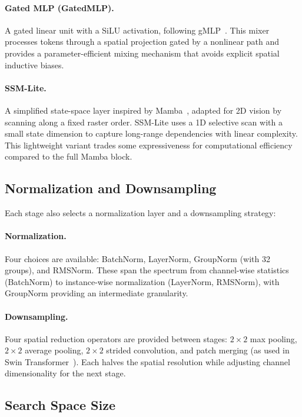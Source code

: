 \documentclass[10pt,twocolumn,letterpaper]{article}
\begin{document}
\paragraph{Gated MLP (GatedMLP).}
A gated linear unit with a SiLU activation, following gMLP~\cite{liu2021gmlp}. This mixer processes tokens through a spatial projection gated by a nonlinear path and provides a parameter-efficient mixing mechanism that avoids explicit spatial inductive biases.

\paragraph{SSM-Lite.}
A simplified state-space layer inspired by Mamba~\cite{gu2023mamba}, adapted for 2D vision by scanning along a fixed raster order. SSM-Lite uses a 1D selective scan with a small state dimension to capture long-range dependencies with linear complexity. This lightweight variant trades some expressiveness for computational efficiency compared to the full Mamba block.

\subsection{Normalization and Downsampling}
\label{sec:norm_down}

Each stage also selects a normalization layer and a downsampling strategy:

\paragraph{Normalization.}
Four choices are available: BatchNorm, LayerNorm, GroupNorm (with 32 groups), and RMSNorm. These span the spectrum from channel-wise statistics (BatchNorm) to instance-wise normalization (LayerNorm, RMSNorm), with GroupNorm providing an intermediate granularity.

\paragraph{Downsampling.}
Four spatial reduction operators are provided between stages: $2 \times 2$ max pooling, $2 \times 2$ average pooling, $2 \times 2$ strided convolution, and patch merging (as used in Swin Transformer~\cite{liu2021swin}). Each halves the spatial resolution while adjusting channel dimensionality for the next stage.

\subsection{Search Space Size}
\label{sec:size}
\end{document}

